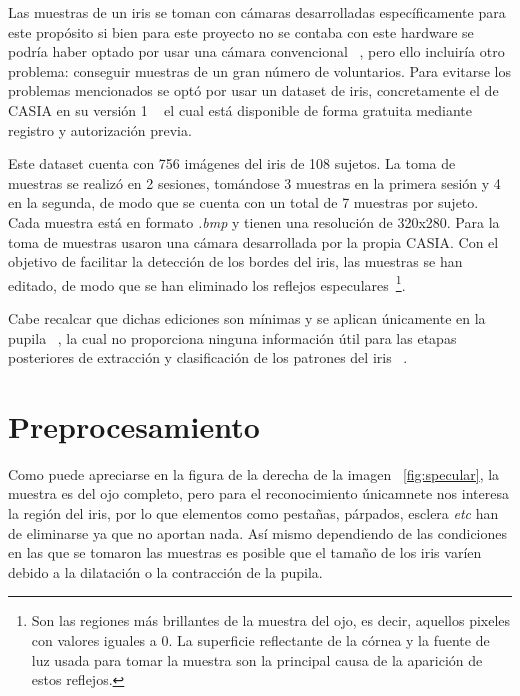 Las muestras de un iris se toman con cámaras desarrolladas específicamente para este propósito si bien para este proyecto no se contaba con este hardware se podría haber optado por usar una cámara convencional ~\cite{sanbishig:2017}, pero ello incluiría otro problema: conseguir muestras de un gran número de voluntarios.
Para evitarse los problemas mencionados se optó por usar un dataset de iris, concretamente el de CASIA en su versión 1 ~\cite{casia:1} el cual está disponible de forma gratuita mediante registro y autorización previa.

Este dataset cuenta con 756 imágenes del iris de 108 sujetos. La toma de muestras se realizó en 2 sesiones, tomándose 3 muestras en la primera sesión y 4 en la segunda, de modo que se cuenta con un total de 7 muestras por sujeto.
Cada muestra está en formato \emph{.bmp} y tienen una resolución de 320x280.
Para la toma de muestras usaron una cámara desarrollada por la propia CASIA.
Con el objetivo de facilitar la detección de los bordes del iris, las muestras se han editado, de modo que se han eliminado los reflejos especulares~\footnote{Son las regiones más brillantes de la muestra del ojo, es decir, aquellos pixeles con valores iguales a 0. La superficie reflectante de la córnea y la fuente de luz usada para tomar la muestra son la principal causa de la aparición de estos reflejos.}.

Cabe recalcar que dichas ediciones son mínimas y se aplican únicamente en la pupila ~\cite{kumar:2019}, la cual no proporciona ninguna información útil para las etapas posteriores de extracción y clasificación de los patrones del iris ~\cite{bowyer:2008}.

\section{Preprocesamiento}
Como puede apreciarse en la figura de la derecha de la imagen ~\ref{fig:specular}, la muestra es del ojo completo, pero para el reconocimiento únicamnete nos interesa la región del iris, por lo que elementos como pestañas, párpados, esclera \emph{etc} han de eliminarse ya que no aportan nada.
Así mismo dependiendo de las condiciones en las que se tomaron las muestras es posible que el tamaño de los iris varíen debido a la dilatación o la contracción de la pupila.

